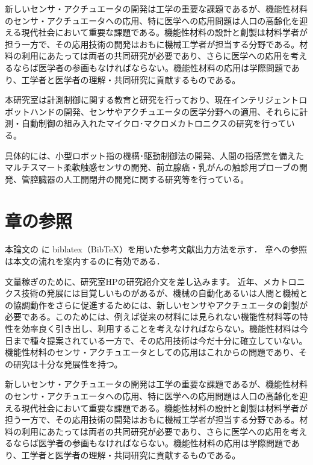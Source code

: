 \documentclass[../main.tex]{subfiles} %
\begin{document}
新しいセンサ・アクチュエータの開発は工学の重要な課題であるが、機能性材料のセンサ・アクチュエータへの応用、特に医学への応用問題は人口の高齢化を迎える現代社会において重要な課題である。機能性材料の設計と創製は材料学者が担う一方で、その応用技術の開発はおもに機械工学者が担当する分野である。材料の利用にあたっては両者の共同研究が必要であり、さらに医学への応用を考えるならば医学者の参画もなければならない。機能性材料の応用は学際問題であり、工学者と医学者の理解・共同研究に貢献するものである。

本研究室は計測制御に関する教育と研究を行っており、現在インテリジェントロボットハンドの開発、センサやアクチュエータの医学分野への適用、それらに計測・自動制御の組み入れたマイクロ･マクロメカトロニクスの研究を行っている。

具体的には、小型ロボット指の機構･駆動制御法の開発、人間の指感覚を備えたマルチスマート柔軟触感センサの開発、前立腺癌・乳がんの触診用プローブの開発、管腔臓器の人工開閉弁の開発に関する研究等を行っている。



\section{章の参照}
本論文の  に biblatex（BibTeX）を用いた参考文献出力方法を示す．
章への参照は本文の流れを案内するのに有効である．

文量稼ぎのために、研究室HPの研究紹介文を差し込みます。 近年、メカトロニクス技術の発展には目覚しいものがあるが、機械の自動化あるいは人間と機械との協調動作をさらに促進するためには、新しいセンサやアクチュエータの創製が必要である。このためには、例えば従来の材料には見られない機能性材料等の特性を効率良く引き出し、利用することを考えなければならない。機能性材料は今日まで種々提案されている一方で、その応用技術は今だ十分に確立していない。機能性材料のセンサ・アクチュエータとしての応用はこれからの問題であり、その研究は十分な発展性を持つ。

新しいセンサ・アクチュエータの開発は工学の重要な課題であるが、機能性材料のセンサ・アクチュエータへの応用、特に医学への応用問題は人口の高齢化を迎える現代社会において重要な課題である。機能性材料の設計と創製は材料学者が担う一方で、その応用技術の開発はおもに機械工学者が担当する分野である。材料の利用にあたっては両者の共同研究が必要であり、さらに医学への応用を考えるならば医学者の参画もなければならない。機能性材料の応用は学際問題であり、工学者と医学者の理解・共同研究に貢献するものである。
\end{document}
